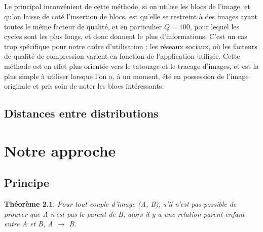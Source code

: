 \documentclass[utf8]{stageM2R} %
\begin{document}
\paragraph{}

Le principal inconvénient de cette méthode, si on utilise les blocs de l'image, et qu'on laisse de coté l'insertion de blocs, est qu'elle se restreint à des images ayant toutes le même facteur de qualité, et en particulier $Q = 100$, pour lequel les cycles sont les plus longs, et donc donnent le plus d'informations. C'est un cas trop spécifique pour notre cadre d'utilisation : les réseaux sociaux, où les facteurs de qualité de compression varient en fonction de l'application utilisée. Cette méthode est en effet plus orientée vers le tatouage et le tracage d'images, et est la plus simple à utiliser lorsque l'on a, à un moment, été en possession de l'image originale et pris soin de noter les blocs intéressants.

\section{Distances entre distributions}
\cite{oikawa2015distances}

\chapter{Notre approche}
\label{chap:notre_approche}
\section{Principe}


\newtheorem*{parentage}{Théorème}
\begin{parentage}
  Pour tout couple d'image (A, B), s'il n'est pas possible de prouver que A n'est pas le parent de B, alors il y a une relation parent-enfant entre A et B, A $\to$ B.
\end{parentage}
\end{document}
